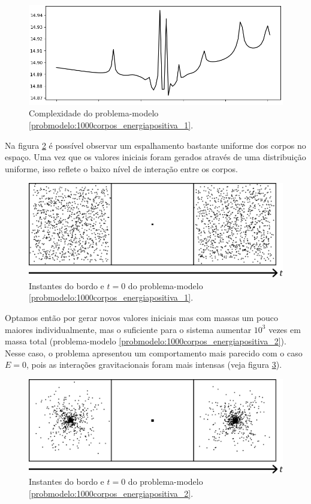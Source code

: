 \begin{figure}[H]
    \centering
    \includegraphics[width=0.6\linewidth]{tcc//img/1000corpos_energiapositiva_complexidade_1.png}
    \caption{Complexidade do problema-modelo \ref{probmodelo:1000corpos_energiapositiva_1}.}
    \label{fig:1000corpos_energiapositiva_complexidade_1}
\end{figure}

Na figura \ref{fig:1000corpos_energiapositiva_posicoes_1} é possível observar um espalhamento bastante uniforme dos corpos no espaço. Uma vez que os valores iniciais foram gerados através de uma distribuição uniforme, isso reflete o baixo nível de interação entre os corpos.

\begin{figure}[H]
    \centering
    \includegraphics[width=0.8\linewidth]{tcc//img/espalhamento_energia_positiva_1000.png}
    \caption{Instantes do bordo e $t=0$ do problema-modelo \ref{probmodelo:1000corpos_energiapositiva_1}.}
    \label{fig:1000corpos_energiapositiva_posicoes_1}
\end{figure}


Optamos então por gerar novos valores iniciais mas com massas um pouco maiores individualmente, mas o suficiente para o sistema aumentar $10^3$ vezes em massa total (problema-modelo \ref{probmodelo:1000corpos_energiapositiva_2}). Nesse caso, o problema apresentou um comportamento mais parecido com o caso $E=0$, pois as interações gravitacionais foram mais intensas (veja figura \ref{fig:1000corpos_energiapositiva_posicoes_2}).

\begin{figure}[H]
    \centering
    \includegraphics[width=0.8\linewidth]{tcc//img/espalhamento_energia_positiva_1000_2.png}
    \caption{Instantes do bordo e $t=0$ do problema-modelo \ref{probmodelo:1000corpos_energiapositiva_2}.}
    \label{fig:1000corpos_energiapositiva_posicoes_2}
\end{figure}

